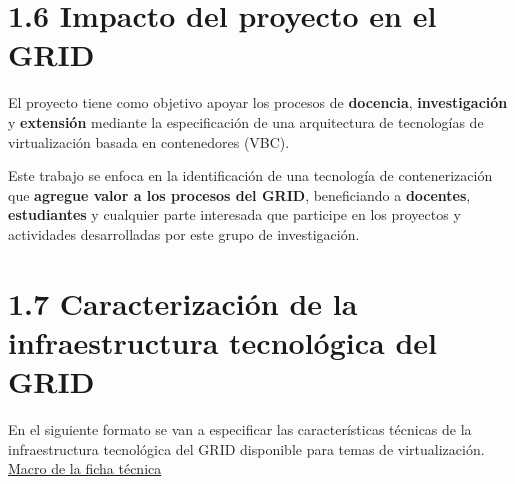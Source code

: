 \section*{1.6 Impacto del proyecto en el GRID}

El proyecto tiene como objetivo apoyar los procesos de \textbf{docencia}, \textbf{investigación} 
y \textbf{extensión} mediante la especificación de una arquitectura de tecnologías de 
virtualización basada en contenedores (VBC). 

Este trabajo se enfoca en la identificación de una tecnología de contenerización que 
\textbf{agregue valor a los procesos del GRID}, beneficiando a \textbf{docentes}, \textbf{estudiantes} 
y cualquier parte interesada que participe en los proyectos y actividades desarrolladas 
por este grupo de investigación.

\section*{1.7 Caracterización de la infraestructura tecnológica del GRID}
En el siguiente formato se van a especificar las características técnicas de la infraestructura tecnológica del GRID disponible para temas de virtualización. \href{https://docs.google.com/spreadsheets/d/14NBv72ucVTrLqGIldYdIsjdBGt3QlgwcblcVRis-DaQ/edit?usp=sharing}{Macro de la ficha técnica}

